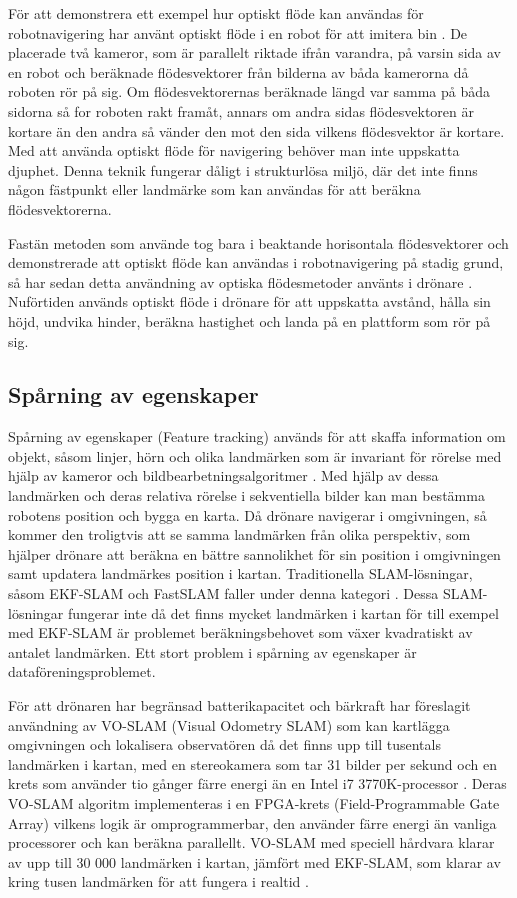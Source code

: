 För att demonstrera ett exempel hur optiskt flöde kan användas för robotnavigering har \cite{341094} använt optiskt flöde i en robot för att imitera bin \citep{341094}. De placerade två kameror, som är parallelt riktade ifrån varandra, på varsin sida av en robot och beräknade flödesvektorer från bilderna av båda kamerorna då roboten rör på sig. Om flödesvektorernas beräknade längd var samma på båda sidorna så for roboten rakt framåt, annars om andra sidas flödesvektoren är kortare än den andra så vänder den mot den sida vilkens flödesvektor är kortare. Med att använda optiskt flöde för navigering behöver man inte uppskatta djuphet. Denna teknik fungerar dåligt i strukturlösa miljö, där det inte finns någon fästpunkt eller landmärke som kan användas för att beräkna flödesvektorerna. 

Fastän metoden som \cite{341094} använde tog bara i beaktande horisontala flödesvektorer och demonstrerade att optiskt flöde kan användas i robotnavigering på stadig grund, så har sedan detta användning av optiska flödesmetoder använts i drönare \citep{6564752}. Nuförtiden används optiskt flöde i drönare för att uppskatta avstånd, hålla sin höjd, undvika hinder, beräkna hastighet och landa på en plattform som rör på sig.

\subsection{Spårning av egenskaper}

Spårning av egenskaper (Feature tracking) används för att skaffa information om objekt, såsom linjer, hörn och olika landmärken som är invariant för rörelse med hjälp av kameror och bildbearbetningsalgoritmer \citep{geospatial}. Med hjälp av dessa landmärken och deras relativa rörelse i sekventiella bilder kan man bestämma robotens position och bygga en karta. Då drönare navigerar i omgivningen, så kommer den troligtvis att se samma landmärken från olika perspektiv, som hjälper drönare att beräkna en bättre sannolikhet för sin position i omgivningen samt updatera landmärkes position i kartan. Traditionella SLAM-lösningar, såsom EKF-SLAM och FastSLAM faller under denna kategori \citep{voslamlatif}. Dessa SLAM-lösningar fungerar inte då det finns mycket landmärken i kartan för till exempel med EKF-SLAM är problemet beräkningsbehovet som växer kvadratiskt av antalet landmärken. Ett stort problem i spårning av egenskaper är dataföreningsproblemet.

För att drönaren har begränsad batterikapacitet och bärkraft har \cite{voslam} föreslagit användning av VO-SLAM (Visual Odometry SLAM) som kan kartlägga omgivningen och lokalisera observatören då det finns upp till tusentals landmärken i kartan, med en stereokamera som tar 31 bilder per sekund och en krets som använder tio gånger färre energi än en Intel i7 3770K-processor \citep{voslam}. Deras VO-SLAM algoritm implementeras i en FPGA-krets (Field-Programmable Gate Array) vilkens logik är omprogrammerbar, den använder färre energi än vanliga processorer och kan beräkna parallellt. VO-SLAM med speciell hårdvara klarar av upp till 30 000 landmärken i kartan, jämfört med EKF-SLAM, som klarar av kring tusen landmärken för att fungera i realtid \citep{ProbabilisticRobotics, voslam}.

